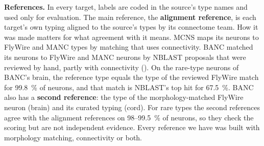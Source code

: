 \documentclass[11pt,a4paper]{article}
\begin{document}
\textbf{References.} In every target, labels are coded in the source's type names and used only for evaluation. The main reference, the \textbf{alignment reference}, is each target's own typing aligned to the source's types by its connectome team. How it was made matters for what agreement with it means. MCNS maps its neurons to FlyWire and MANC types by matching that uses connectivity. BANC matched its neurons to FlyWire and MANC neurons by NBLAST proposals that were reviewed by hand, partly with connectivity (\citealp{bates2026}). On the rare-type neurons of BANC's brain, the reference type equals the type of the reviewed FlyWire match for 99.8~\% of neurons, and that match is NBLAST's top hit for 67.5~\%. BANC also has a \textbf{second reference}: the type of the morphology-matched FlyWire neuron (brain) and its curated typing (cord). For rare types the second references agree with the alignment references on 98–99.5~\% of neurons, so they check the scoring but are not independent evidence. Every reference we have was built with morphology matching, connectivity or both.
\end{document}
